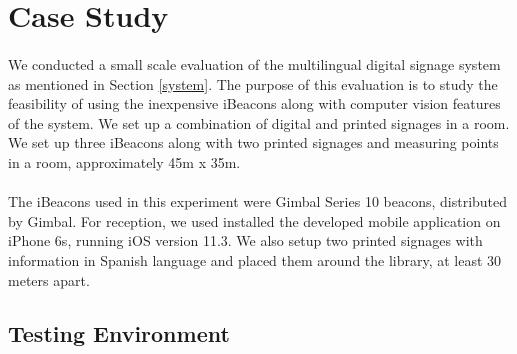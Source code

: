 \documentclass[12pt]{article}
\begin{document}
\section{Case Study}
\label{evaluation}

%


\paragraph{}We conducted a small scale evaluation of the multilingual digital signage system as mentioned in Section \ref{system}. The purpose of this evaluation is to study the feasibility of using the inexpensive iBeacons along with computer vision features of the system. We set up a combination of digital and printed signages in a room. We set up three iBeacons along with two printed signages and measuring points in a room, approximately 45m x 35m.

\paragraph{}The iBeacons used in this experiment were Gimbal Series 10 beacons, distributed by Gimbal. For reception, we used installed the developed mobile application on iPhone 6s, running iOS version 11.3. We also setup two printed signages with information in Spanish language and placed them around the library, at least 30 meters apart.

\subsection{Testing Environment}
\end{document}
